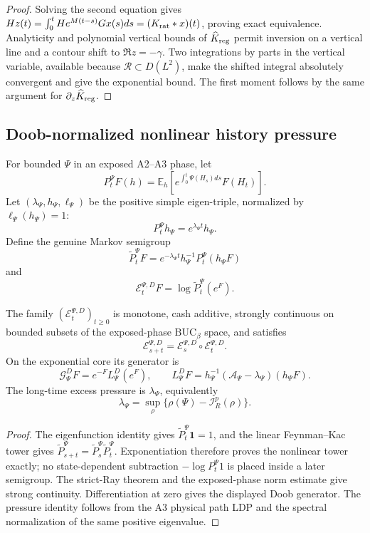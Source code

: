 \begin{proof}
Solving the second equation gives
\(Hz(t)=\int_0^tHe^{M(t-s)}Gx(s)ds=(K_{\rm rat}*x)(t)\), proving exact
equivalence.  Analyticity and polynomial vertical bounds of
\(\widehat K_{\rm reg}\) permit inversion on a vertical line and a contour
shift to \(\Re z=-\gamma\).  Two integrations by parts in the vertical
variable, available because \(\mathcal R\subset D(L^2)\), make the shifted
integral absolutely convergent and give the exponential bound.  The first
moment follows by the same argument for \(\partial_z\widehat K_{\rm reg}\).
\end{proof}

\subsection{Doob-normalized nonlinear history pressure}

For bounded \(\Psi\) in an exposed A2--A3 phase, let
\[
 P_t^\Psi F(h)=
 \mathbb E_h\left[e^{\int_0^t\Psi(H_s)ds}F(H_t)\right].
\]
Let \((\lambda_\Psi,h_\Psi,\ell_\Psi)\) be the positive simple eigen-triple,
normalized by \(\ell_\Psi(h_\Psi)=1\):
\[
 P_t^\Psi h_\Psi=e^{\lambda_\Psi t}h_\Psi.
\]
Define the genuine Markov semigroup
\[
 \widetilde P_t^\Psi F
 =e^{-\lambda_\Psi t}h_\Psi^{-1}
 P_t^\Psi(h_\Psi F)
\]
and
\[
 \mathcal E_t^{\Psi,D}F
 =\log\widetilde P_t^\Psi(e^F).
\]

\begin{theorem}
\label{thm:r3-a4-nonlinear}
The family \((\mathcal E_t^{\Psi,D})_{t\ge0}\) is monotone, cash additive,
strongly continuous on bounded subsets of the exposed-phase
\(\mathrm{BUC}_\beta\) space, and satisfies
\[
 \mathcal E_{s+t}^{\Psi,D}
 =\mathcal E_s^{\Psi,D}\circ\mathcal E_t^{\Psi,D}.
\]
On the exponential core its generator is
\[
 \mathcal G_\Psi^DF
 =e^{-F}L_\Psi^D(e^F),
 \qquad
 L_\Psi^DF=h_\Psi^{-1}(\mathcal A_\Psi-\lambda_\Psi)
 (h_\Psi F).
\]
The long-time excess pressure is \(\lambda_\Psi\), equivalently
\[
 \lambda_\Psi
 =\sup_\rho\{\rho(\Psi)-\mathcal I_R^p(\rho)\}.
\]
\end{theorem}

\begin{proof}
The eigenfunction identity gives
\(\widetilde P_t^\Psi\mathbf1=1\), and the linear Feynman--Kac tower gives
\(\widetilde P_{s+t}^\Psi=\widetilde P_s^\Psi\widetilde P_t^\Psi\).
Exponentiation therefore proves the nonlinear tower exactly; no state-dependent
subtraction \(-\log P_t^\Psi1\) is placed inside a later semigroup.  The
strict-Ray theorem and the exposed-phase norm estimate give strong
continuity.  Differentiation at zero gives the displayed Doob generator.  The
pressure identity follows from the A3 physical path LDP and the spectral
normalization of the same positive eigenvalue.
\end{proof}

